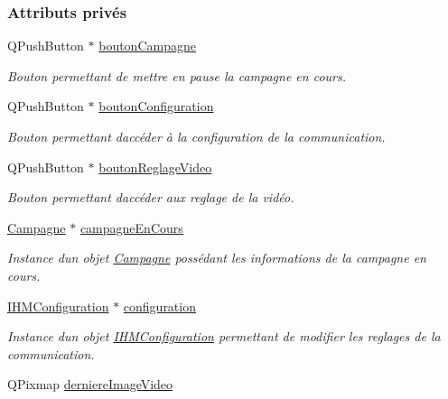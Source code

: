 \subsubsection*{Attributs privés}
\begin{DoxyCompactItemize}
\item 
Q\+Push\+Button $\ast$ \hyperlink{class_i_h_m_rov_a324be23537f48127c49b943aa439a978}{bouton\+Campagne}
\begin{DoxyCompactList}\small\item\em Bouton permettant de mettre en pause la campagne en cours. \end{DoxyCompactList}\item 
Q\+Push\+Button $\ast$ \hyperlink{class_i_h_m_rov_aea67721180bf155892a297b3c39309c5}{bouton\+Configuration}
\begin{DoxyCompactList}\small\item\em Bouton permettant d\textquotesingle{}accéder à la configuration de la communication. \end{DoxyCompactList}\item 
Q\+Push\+Button $\ast$ \hyperlink{class_i_h_m_rov_a57cb3bea4f1f9149d730ccc5688581fc}{bouton\+Reglage\+Video}
\begin{DoxyCompactList}\small\item\em Bouton permettant d\textquotesingle{}accéder aux reglage de la vidéo. \end{DoxyCompactList}\item 
\hyperlink{class_campagne}{Campagne} $\ast$ \hyperlink{class_i_h_m_rov_af0475e935531b7331f097ae13d07989b}{campagne\+En\+Cours}
\begin{DoxyCompactList}\small\item\em Instance d\textquotesingle{}un objet \hyperlink{class_campagne}{Campagne} possédant les informations de la campagne en cours. \end{DoxyCompactList}\item 
\hyperlink{class_i_h_m_configuration}{I\+H\+M\+Configuration} $\ast$ \hyperlink{class_i_h_m_rov_a29f4de081899d8830376f1ad27e74647}{configuration}
\begin{DoxyCompactList}\small\item\em Instance d\textquotesingle{}un objet \hyperlink{class_i_h_m_configuration}{I\+H\+M\+Configuration} permettant de modifier les reglages de la communication. \end{DoxyCompactList}\item 
Q\+Pixmap \hyperlink{class_i_h_m_rov_a2081e30323773ee895199ec026d82fc8}{derniere\+Image\+Video}

\end{DoxyCompactItemize}
